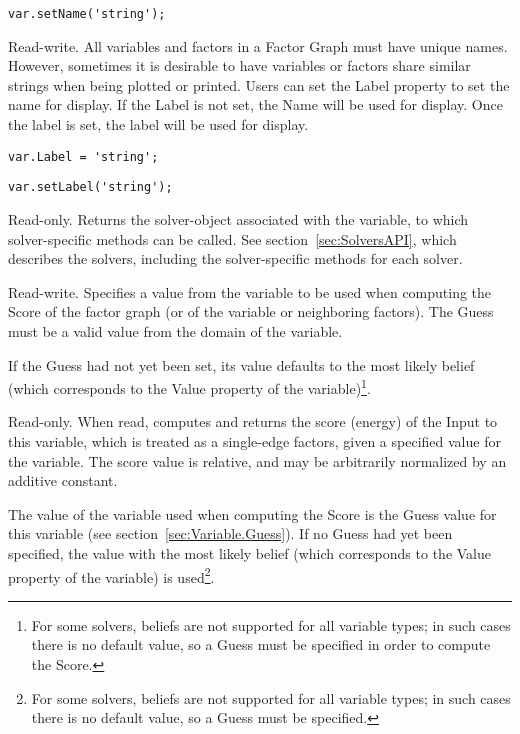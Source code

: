 \ifjava
\begin{lstlisting}
var.setName('string');
\end{lstlisting}

\fi


Read-write. All variables and factors in a Factor Graph must have unique names. However, sometimes it is desirable to have variables or factors share similar strings when being plotted or printed. Users can set the Label property to set the name for display. If the Label is not set, the Name will be used for display. Once the label is set, the label will be used for display.

\ifmatlab
\begin{lstlisting}
var.Label = 'string';
\end{lstlisting}
\fi

\ifjava
\begin{lstlisting}
var.setLabel('string');
\end{lstlisting}
\fi



Read-only.  Returns the solver-object associated with the variable, to which solver-specific methods can be called.  See section~\ref{sec:SolversAPI}, which describes the solvers, including the solver-specific methods for each solver.

\label{sec:Variable.Guess}

Read-write.  Specifies a value from the variable to be used when computing the Score of the factor graph (or of the variable or neighboring factors).  The Guess must be a valid value from the domain of the variable.

If the Guess had not yet been set, its value defaults to the most likely belief (which corresponds to the Value property of the variable)\footnote{For some solvers, beliefs are not supported for all variable types; in such cases there is no default value, so a Guess must be specified in order to compute the Score.}.


\label{sec:Variable.Score}

Read-only.  When read, computes and returns the score (energy) of the Input to this variable, which is treated as a single-edge factors, given a specified value for the variable.  The score value is relative, and may be arbitrarily normalized by an additive constant.

The value of the variable used when computing the Score is the Guess value for this variable (see section~\ref{sec:Variable.Guess}).  If no Guess had yet been specified, the value with the most likely belief (which corresponds to the Value property of the variable) is used\footnote{For some solvers, beliefs are not supported for all variable types; in such cases there is no default value, so a Guess must be specified.}.


